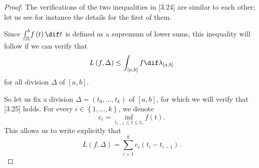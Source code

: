 \documentclass[pmath450]{subfiles}
\begin{document}
    \begin{proof}
        The verifications of the two inequalities in [3.24] are similar to each other; let us see for instance the details for the first of them.

        Since $\underline{\int_{a}^b}f\left( t \right)\dif t$ is defined as a supremum of lower sums, this inequality will follow if we can verify that
        \begin{equation}
            L\left( f,\Delta \right)\leq \int_{\left[ a,b \right]}f\dif\lambda_{\left[ a,b \right]}
        \end{equation}
        for all division $\Delta$ of $\left[ a,b \right]$.

        So let us fix a division $\Delta=\left( t_0,\ldots,t_k \right)$ of $\left[ a,b \right]$, for which we will verify that [3.25] holds. For every $i\in\left\lbrace 1,\ldots,k \right\rbrace$, we denote
        \begin{equation*}
            c_i = \inf_{t_{i-1}\leq t\leq t_i}f\left( t \right).
        \end{equation*}
        This allows us to write explicitly that
        \begin{equation*}
            L\left( f,\Delta \right) = \sum^{k}_{i=1}c_i\left( t_i-t_{i-1} \right).
        \end{equation*}


\end{proof}
\end{document}
